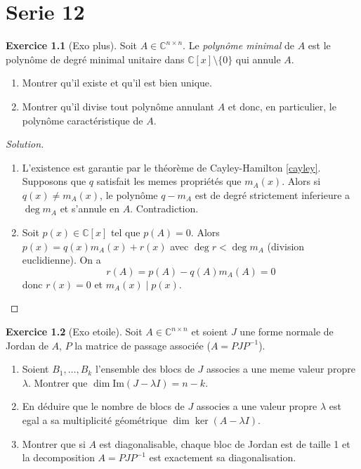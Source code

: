 \documentclass[a4paper,12pt,french]{report}
\theoremstyle{plain}
\theoremstyle{definition}
\newtheorem{exercise}{Exercice}[chapter]
\begin{document}
\chapter{Serie 12}
\begin{exercise}[Exo plus]
Soit $A\in \mathbb{C}^{n\times n}$. Le \emph{polynôme minimal} de $A$ est le polynôme de degré minimal unitaire dans $\mathbb{C}[x]\setminus \{ 0 \}$ qui annule $A$.
\begin{enumerate}
\item Montrer qu'il existe et qu'il est bien unique.
\item Montrer qu'il divise tout polynôme annulant $A$ et donc, en particulier, le polynôme caractéristique de $A$.
\end{enumerate}
\end{exercise}
\begin{proof}[Solution]
\begin{enumerate}
\item L'existence est garantie par le théorème de Cayley-Hamilton \ref{cayley}. Supposons que $q$ satisfait les memes propriétés que $m_{A}(x)$. Alors si $q(x)\neq m_{A}(x)$, le polynôme $q-m_{A}$ est de degré strictement inferieure a $\deg m_{A}$ et s'annule en $A$. Contradiction.
\item Soit $p(x)\in \mathbb{C}[x]$ tel que $p(A)=0$. Alors $p(x)=q(x)m_{A}(x)+r(x)$ avec $\deg r <\deg m_{A}$ (division euclidienne). On a
$$
r(A)=p(A)-q(A)m_{A}(A)=0
$$
donc $r(x)=0$ et $m_{A}(x)\mid p(x)$.
\end{enumerate}
\end{proof}
\begin{exercise}[Exo etoile]\label{12star}
Soit $A\in \mathbb{C}^{n\times n}$ et soient $J$ une forme normale de Jordan de $A$, $P$ la matrice de passage associée ($A=PJP^{-1}$).
\begin{enumerate}
\item Soient $B_{1},\dots,B_{k}$ l'ensemble des blocs de $J$ associes a une meme valeur propre $\lambda$. Montrer que $\dim \mathrm{Im}(J-\lambda I)=n-k$.
\item En déduire que le nombre de blocs de $J$ associes a une valeur propre $\lambda$ est egal a sa multiplicité géométrique $\dim\ker(A-\lambda I)$.
\item Montrer que si $A$ est diagonalisable, chaque bloc de Jordan est de taille 1 et la decomposition $A=PJP^{-1}$ est exactement sa diagonalisation.
\end{enumerate}
\end{exercise}
\end{document}
